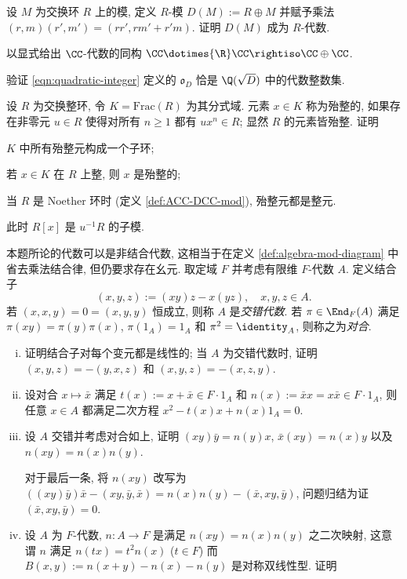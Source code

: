 \begin{Exercises}
	\item 设 $M$ 为交换环 $R$ 上的模, 定义 $R$-模 $D(M) := R \oplus M$ 并赋予乘法 $(r,m) (r', m') = (rr', rm' +r'm)$. 证明 $D(M)$ 成为 $R$-代数.
	\item 以显式给出 $\CC$-代数的同构 $\CC \dotimes{\R} \CC \rightiso \CC \oplus \CC$.
	\item 验证 \eqref{eqn:quadratic-integer} 定义的 $\mathfrak{o}_D$ 恰是 $\Q(\sqrt{D})$ 中的代数整数集.
	\item 设 $R$ 为交换整环, 令 $K = \text{Frac}(R)$ 为其分式域. 元素 $x \in K$ 称为殆整的, 如果存在非零元 $u \in R$ 使得对所有 $n \geq 1$ 都有 $ux^n \in R$; 显然 $R$ 的元素皆殆整. 证明
		\begin{compactitem}
			\item $K$ 中所有殆整元构成一个子环;
			\item 若 $x \in K$ 在 $R$ 上整, 则 $x$ 是殆整的; 
			\item 当 $R$ 是 Noether 环时 (定义 \ref{def:ACC-DCC-mod}), 殆整元都是整元. \begin{hint} 此时 $R[x]$ 是 $u^{-1} R$ 的子模.\end{hint}
		\end{compactitem}
	\item 本题所论的代数可以是非结合代数, 这相当于在定义 \ref{def:algebra-mod-diagram} 中省去乘法结合律, 但仍要求存在幺元. 取定域 $F$ 并考虑有限维 $F$-代数 $A$. 定义结合子
		\[ (x,y,z) := (xy)z - x(yz), \quad x,y,z \in A. \]
		若 $(x,x,y)=0=(x,y,y)$ 恒成立, 则称 $A$ 是\emph{交错代数}. 若 $\pi \in \End_F(A)$ 满足 $\pi(xy)=\pi(y)\pi(x)$, $\pi(1_A)=1_A$ 和 $\pi^2 = \identity_A$, 则称之为\emph{对合}.
		\begin{enumerate}[(i)]
			\item 证明结合子对每个变元都是线性的; 当 $A$ 为交错代数时, 证明 $(x,y,z) = -(y,x,z)$ 和 $(x,y,z) = -(x,z,y)$.
			\item 设对合 $x \mapsto \bar{x}$ 满足 $t(x) := x+\bar{x} \in F \cdot 1_A$ 和 $n(x) := \bar{x}x = x\bar{x} \in F \cdot 1_A$, 则任意 $x \in A$ 都满足二次方程 $x^2 - t(x)x + n(x) 1_A = 0$.
			\item 设 $A$ 交错并考虑对合如上, 证明 $(xy)\bar{y} = n(y)x$, $\bar{x}(xy) = n(x)y$ 以及 $n(xy)=n(x)n(y)$.
			\begin{hint} 对于最后一条, 将 $n(xy)$ 改写为 $((xy)\bar{y})\bar{x} - (xy, \bar{y}, \bar{x}) = n(x)n(y) - (\bar{x}, xy, \bar{y})$, 问题归结为证 $(\bar{x}, xy, \bar{y}) = 0$. \end{hint}
			\item 设 $A$ 为 $F$-代数, $n: A \to F$ 是满足 $n(xy)=n(x)n(y)$ 之二次映射, 这意谓 $n$ 满足 $n(tx)=t^2 n(x)$ ($t \in F$) 而 $B(x,y) := n(x+y)-n(x)-n(y)$ 是对称双线性型. 证明

\end{enumerate}
\end{Exercises}
